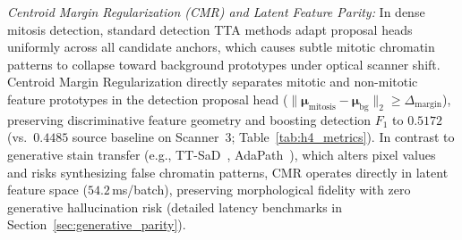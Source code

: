 \documentclass[journal]{IEEEtran}
\begin{document}
\begin{table}[t]
\centering
\caption{Paired Case-Clustered Bootstrap Contrasts ($B = 10{,}000$ Resamples) on Scanner 3.}
\label{tab:bootstrap_contrasts}
\scriptsize
\renewcommand{\arraystretch}{0.92}
\setlength{\tabcolsep}{3pt}
\end{table}

\textit{Centroid Margin Regularization (CMR) and Latent Feature Parity:} In dense mitosis detection, standard detection TTA methods adapt proposal heads uniformly across all candidate anchors, which causes subtle mitotic chromatin patterns to collapse toward background prototypes under optical scanner shift. Centroid Margin Regularization directly separates mitotic and non-mitotic feature prototypes in the detection proposal head ($\|\boldsymbol{\mu}_{\text{mitosis}} - \boldsymbol{\mu}_{\text{bg}}\|_2 \ge \Delta_{\text{margin}}$), preserving discriminative feature geometry and boosting detection $F_1$ to $0.5172$ (vs.\ $0.4485$ source baseline on Scanner~3; Table~\ref{tab:h4_metrics}). In contrast to generative stain transfer (e.g., TT-SaD~\cite{ttsad2024}, AdaPath~\cite{chen2023adapath}), which alters pixel values and risks synthesizing false chromatin patterns, CMR operates directly in latent feature space ($54.2$\,ms/batch), preserving morphological fidelity with zero generative hallucination risk (detailed latency benchmarks in Section~\ref{sec:generative_parity}).
\end{document}
